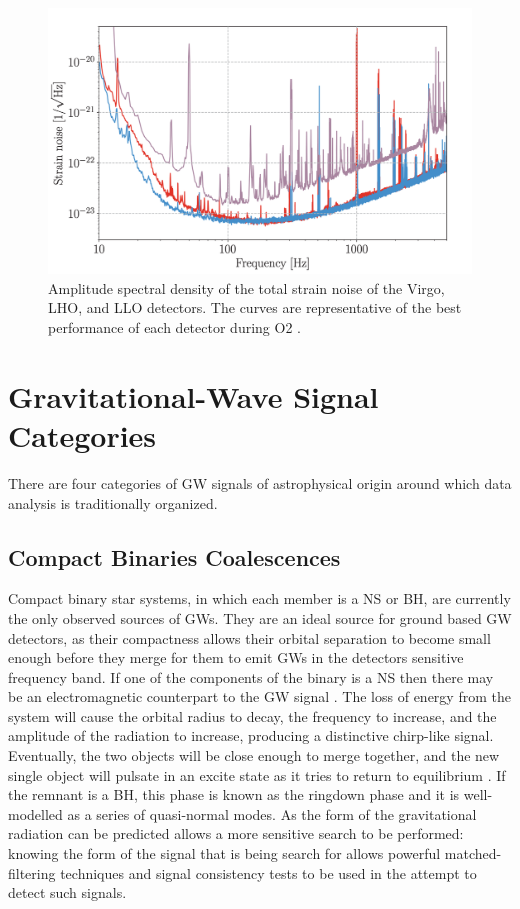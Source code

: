 \documentclass[binding=0.6cm, LaM]{sapthesis}
\begin{document}
        \begin{figure}[t]
          \includegraphics[scale=0.6]{noise1}
          \centering
          \caption{Amplitude spectral density of the total strain noise of the Virgo, LHO, and LLO detectors. The curves are representative of the best performance of each detector during O2 \cite{13}.}
          \label{fig:noise1}
        \end{figure}

\section{Gravitational-Wave Signal Categories}
\label{sec:sources}
	There are four categories of GW signals of astrophysical origin around which data analysis is traditionally organized.

\subsection{Compact Binaries Coalescences}
	Compact binary star systems, in which each member is a NS or BH, 
	are currently the only observed sources of GWs.
	They are an ideal source for ground based GW detectors, 
	as their compactness allows their orbital separation to become 
	small enough before they merge for them to emit GWs in the detectors sensitive frequency band.
	If one of the components of the binary is a NS 
	then there may be an electromagnetic counterpart to the GW signal \cite{20}. 
	The loss of energy from the system will cause the orbital radius to decay, 
	the frequency to increase, and the amplitude of the radiation to increase, 
	producing a distinctive chirp-like signal. 
	Eventually, the two objects will be close enough to merge together, 
	and the new single object will pulsate in an excite state as it tries to return to equilibrium \cite{21}. 
	If the remnant is a BH, this phase is known as the ringdown phase and it is well-modelled as a series of quasi-normal modes. 
	As the form of the gravitational radiation can be predicted allows 
	a more sensitive search to be performed: knowing the form of the signal 
	that is being search for allows powerful matched-filtering techniques 
	and signal consistency tests to be used in the attempt to detect such signals.
\end{document}
